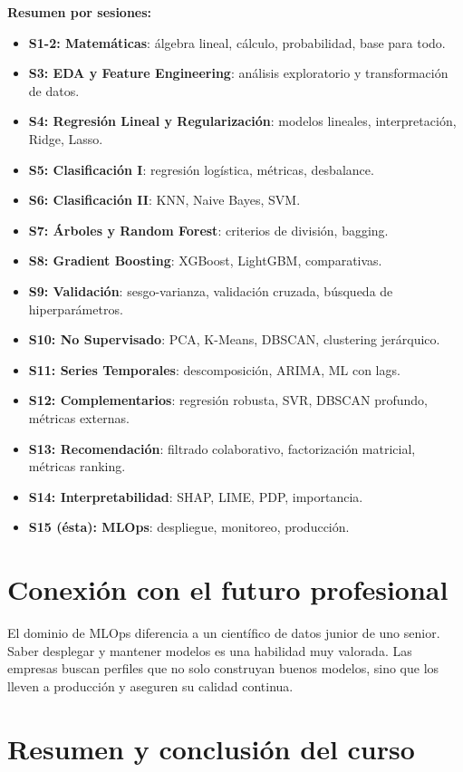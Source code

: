 \documentclass[12pt,a4paper,openany,oneside]{book}
\begin{document}
\textbf{Resumen por sesiones:}
\begin{itemize}
    \item \textbf{S1-2: Matemáticas}: álgebra lineal, cálculo, probabilidad, base para todo.
    \item \textbf{S3: EDA y Feature Engineering}: análisis exploratorio y transformación de datos.
    \item \textbf{S4: Regresión Lineal y Regularización}: modelos lineales, interpretación, Ridge, Lasso.
    \item \textbf{S5: Clasificación I}: regresión logística, métricas, desbalance.
    \item \textbf{S6: Clasificación II}: KNN, Naive Bayes, SVM.
    \item \textbf{S7: Árboles y Random Forest}: criterios de división, bagging.
    \item \textbf{S8: Gradient Boosting}: XGBoost, LightGBM, comparativas.
    \item \textbf{S9: Validación}: sesgo-varianza, validación cruzada, búsqueda de hiperparámetros.
    \item \textbf{S10: No Supervisado}: PCA, K-Means, DBSCAN, clustering jerárquico.
    \item \textbf{S11: Series Temporales}: descomposición, ARIMA, ML con lags.
    \item \textbf{S12: Complementarios}: regresión robusta, SVR, DBSCAN profundo, métricas externas.
    \item \textbf{S13: Recomendación}: filtrado colaborativo, factorización matricial, métricas ranking.
    \item \textbf{S14: Interpretabilidad}: SHAP, LIME, PDP, importancia.
    \item \textbf{S15 (ésta): MLOps}: despliegue, monitoreo, producción.
\end{itemize}

\section{Conexión con el futuro profesional}

El dominio de MLOps diferencia a un científico de datos junior de uno senior. Saber desplegar y mantener modelos es una habilidad muy valorada. Las empresas buscan perfiles que no solo construyan buenos modelos, sino que los lleven a producción y aseguren su calidad continua.

\section{Resumen y conclusión del curso}
\end{document}

